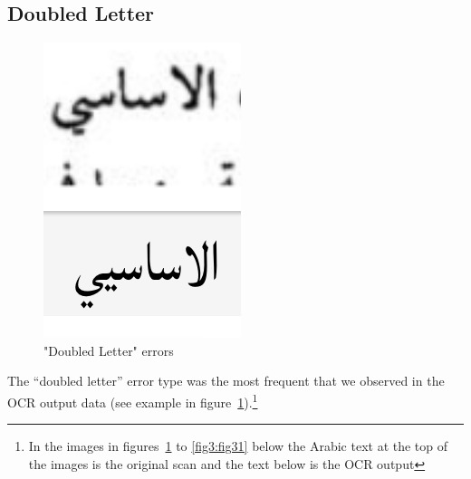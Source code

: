 \subsection{Doubled Letter}

\begin{figure}[h]
	\includegraphics[width=\linewidth]{images/image20.png}
	\caption{"Doubled Letter" errors}
	\label{fig3:fig4}
\end{figure}

The “doubled letter” error type was the most frequent that we observed in the
OCR output data (see example in figure~\ref{fig3:fig4}).\footnote{In the images
in figures~\ref{fig3:fig4} to \ref{fig3:fig31}  below the Arabic text at the top
of the images is the original scan and the text below is the OCR output}
                   
